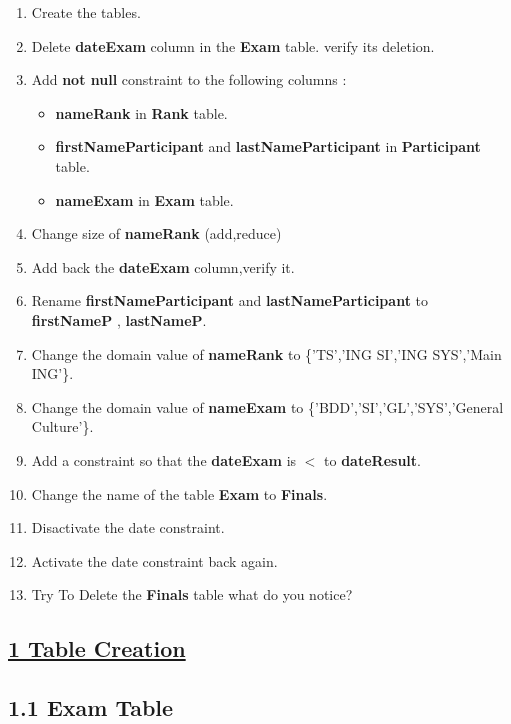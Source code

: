 \vspace{0.35cm}
\begin{enumerate}
    \item Create the tables.
    \item Delete \textbf{dateExam} column in the \textbf{Exam} table. verify its deletion.
    \item Add \textbf{not null} constraint to the following columns :
        \begin{itemize}
            \item \textbf{nameRank} in \textbf{Rank} table.
            \item \textbf{firstNameParticipant} and \textbf{lastNameParticipant} in \textbf{Participant} table.
            \item \textbf{nameExam} in \textbf{Exam} table.
        \end{itemize}
    \item Change size of \textbf{nameRank} (add,reduce)
    \item Add back the \textbf{dateExam} column,verify it.
    \item Rename  \textbf{firstNameParticipant} and \textbf{lastNameParticipant} to \textbf{firstNameP} , \textbf{lastNameP}.
    \item Change the domain value of \textbf{nameRank} to \{'TS','ING SI','ING SYS','Main ING'\}.
    \item Change the domain value of  \textbf{nameExam} to \{'BDD','SI','GL','SYS','General Culture'\}.
    \item Add a constraint so that the \textbf{dateExam} is \(<\) to \textbf{dateResult}.
    \item Change the name of the table \textbf{Exam} to \textbf{Finals}.
    \item Disactivate the date constraint.
    \item Activate the date constraint back again.
    \item Try To Delete the \textbf{Finals} table what do you notice?
\end{enumerate}

\vspace{0.35cm}
\subsection*{\underline{1 Table Creation}}
\subsection*{1.1 Exam Table}


